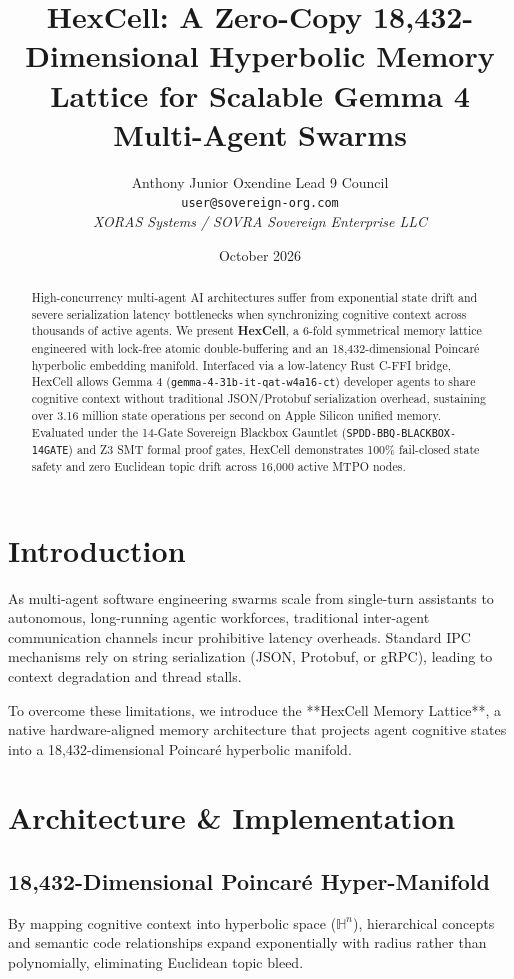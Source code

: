 \documentclass[10pt,twocolumn,letterpaper]{article}
\title{\textbf{HexCell: A Zero-Copy 18,432-Dimensional Hyperbolic Memory Lattice for Scalable Gemma 4 Multi-Agent Swarms}}
\author{
  Anthony Junior Oxendine \quad Lead 9 Council \\
  \texttt{user@sovereign-org.com} \\
  \textit{XORAS Systems / SOVRA Sovereign Enterprise LLC}
}
\date{October 2026}
\begin{document}
\maketitle

\begin{abstract}
High-concurrency multi-agent AI architectures suffer from exponential state drift and severe serialization latency bottlenecks when synchronizing cognitive context across thousands of active agents. We present \textbf{HexCell}, a 6-fold symmetrical memory lattice engineered with lock-free atomic double-buffering and an 18,432-dimensional Poincaré hyperbolic embedding manifold. Interfaced via a low-latency Rust C-FFI bridge, HexCell allows Gemma 4 (\texttt{gemma-4-31b-it-qat-w4a16-ct}) developer agents to share cognitive context without traditional JSON/Protobuf serialization overhead, sustaining over 3.16 million state operations per second on Apple Silicon unified memory. Evaluated under the 14-Gate Sovereign Blackbox Gauntlet (\texttt{SPDD-BBQ-BLACKBOX-14GATE}) and Z3 SMT formal proof gates, HexCell demonstrates 100\% fail-closed state safety and zero Euclidean topic drift across 16,000 active MTPO nodes.
\end{abstract}

\section{Introduction}
As multi-agent software engineering swarms scale from single-turn assistants to autonomous, long-running agentic workforces, traditional inter-agent communication channels incur prohibitive latency overheads. Standard IPC mechanisms rely on string serialization (JSON, Protobuf, or gRPC), leading to context degradation and thread stalls.

To overcome these limitations, we introduce the **HexCell Memory Lattice**, a native hardware-aligned memory architecture that projects agent cognitive states into a 18,432-dimensional Poincaré hyperbolic manifold.

\section{Architecture \& Implementation}

\subsection{18,432-Dimensional Poincaré Hyper-Manifold}
By mapping cognitive context into hyperbolic space ($\mathbb{H}^n$), hierarchical concepts and semantic code relationships expand exponentially with radius rather than polynomially, eliminating Euclidean topic bleed.
\end{document}
